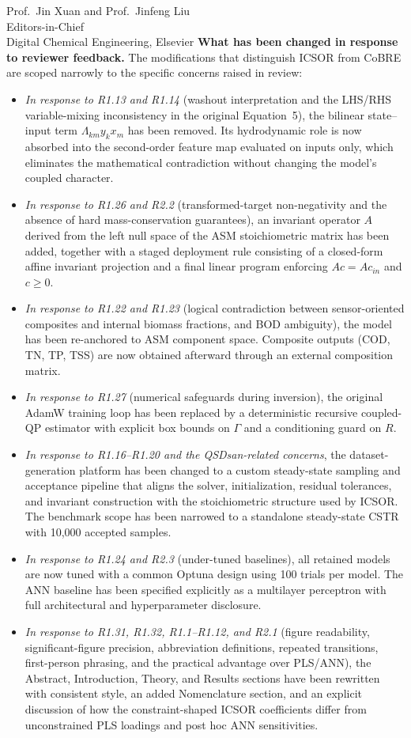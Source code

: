 \documentclass[11pt,a4paper]{letter}
\begin{document}
\begin{letter}{Prof.\ Jin Xuan and Prof.\ Jinfeng Liu \\ Editors-in-Chief \\ Digital Chemical Engineering, Elsevier}
\textbf{What has been changed in response to reviewer feedback.} The modifications that distinguish ICSOR from CoBRE are scoped narrowly to the specific concerns raised in review:
\begin{itemize}
    \item \textit{In response to R1.13 and R1.14} (washout interpretation and the LHS/RHS variable-mixing inconsistency in the original Equation~5), the bilinear state--input term $\Lambda_{km} y_k x_m$ has been removed. Its hydrodynamic role is now absorbed into the second-order feature map evaluated on inputs only, which eliminates the mathematical contradiction without changing the model's coupled character.
    \item \textit{In response to R1.26 and R2.2} (transformed-target non-negativity and the absence of hard mass-conservation guarantees), an invariant operator $A$ derived from the left null space of the ASM stoichiometric matrix has been added, together with a staged deployment rule consisting of a closed-form affine invariant projection and a final linear program enforcing $Ac = Ac_{in}$ and $c \ge 0$.
    \item \textit{In response to R1.22 and R1.23} (logical contradiction between sensor-oriented composites and internal biomass fractions, and BOD ambiguity), the model has been re-anchored to ASM component space. Composite outputs (COD, TN, TP, TSS) are now obtained afterward through an external composition matrix.
    \item \textit{In response to R1.27} (numerical safeguards during inversion), the original AdamW training loop has been replaced by a deterministic recursive coupled-QP estimator with explicit box bounds on $\Gamma$ and a conditioning guard on $R$.
    \item \textit{In response to R1.16--R1.20 and the QSDsan-related concerns}, the dataset-generation platform has been changed to a custom steady-state sampling and acceptance pipeline that aligns the solver, initialization, residual tolerances, and invariant construction with the stoichiometric structure used by ICSOR. The benchmark scope has been narrowed to a standalone steady-state CSTR with 10{,}000 accepted samples.
    \item \textit{In response to R1.24 and R2.3} (under-tuned baselines), all retained models are now tuned with a common Optuna design using 100 trials per model. The ANN baseline has been specified explicitly as a multilayer perceptron with full architectural and hyperparameter disclosure.
    \item \textit{In response to R1.31, R1.32, R1.1--R1.12, and R2.1} (figure readability, significant-figure precision, abbreviation definitions, repeated transitions, first-person phrasing, and the practical advantage over PLS/ANN), the Abstract, Introduction, Theory, and Results sections have been rewritten with consistent style, an added Nomenclature section, and an explicit discussion of how the constraint-shaped ICSOR coefficients differ from unconstrained PLS loadings and post hoc ANN sensitivities.
\end{itemize}


\end{letter}
\end{document}
